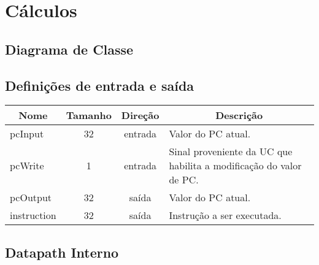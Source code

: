 \section{Cálculos}
	\subsection{Diagrama de Classe}
  \begin{figure}[h]
    
  \end{figure}
		
		\subsection{Definições de entrada e saída}
		
	\begin{center}
		\begin{longtable}[pos]{| l | c | c | m{7cm} |} \hline
			\multicolumn{1}{|c|}{\cellcolor[gray]{0.9}\textbf{Nome}} & 
			\multicolumn{1}{c|}{\cellcolor[gray]{0.9}\textbf{Tamanho}} & 
			\multicolumn{1}{c|}{\cellcolor[gray]{0.9}\textbf{Direção}} &
			\multicolumn{1}{c|}{\cellcolor[gray]{0.9}\textbf{Descrição}} \\ \hline
			\endhead
			\hline
			\endlastfoot
			
			pcInput & 32 & entrada & Valor do PC atual.\\ \hline
			pcWrite & 1 & entrada & Sinal proveniente da UC que habilita a modificação do valor de PC. \\ \hline
			pcOutput & 32 & saída & Valor do PC atual. \\ \hline
			instruction & 32 & saída & Instrução a ser executada. \\ \hline
			
		\end{longtable}
	\end{center}
	
	\subsection{Datapath Interno}
	
